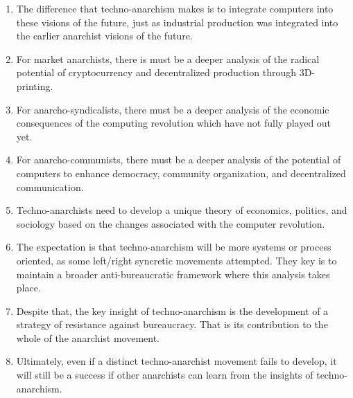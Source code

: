 \documentclass{article}
\begin{document}
\begin{enumerate}
\item The difference that techno-anarchism makes is to integrate computers into these visions of the future, just as industrial production was integrated into the earlier anarchist visions of the future.
\item For market anarchists, there is must be a deeper analysis of the radical potential of cryptocurrency and decentralized production through 3D-printing.
\item For anarcho-syndicalists, there must be a deeper analysis of the economic consequences of the computing revolution which have not fully played out yet.
\item For anarcho-communists, there must be a deeper analysis of the potential of computers to enhance democracy, community organization, and decentralized communication.
\item Techno-anarchists need to develop a unique theory of economics, politics, and sociology based on the changes associated with the computer revolution.
\item The expectation is that techno-anarchism will be more systems or process oriented, as some left/right syncretic movements attempted. They key is to maintain a broader anti-bureaucratic framework where this analysis takes place.
\item Despite that, the key insight of techno-anarchism is the development of a strategy of resistance against bureaucracy. That is its contribution to the whole of the anarchist movement.
\item Ultimately, even if a distinct techno-anarchist movement fails to develop, it will still be a success if other anarchists can learn from the insights of techno-anarchism.
\end{enumerate}
\end{document}
